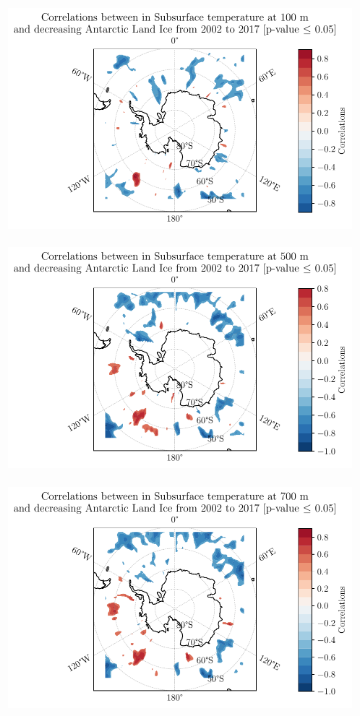 \documentclass[../main.tex]{subfiles}
\begin{document}
\begin{figure}[hbt!]
    \centering
    \begin{subfigure}[b]{0.45\textwidth}
    \includegraphics[width=\textwidth]{images/2021w5/chapter7/hres/decreasing_correlation_spatial_subsurtemp_100}
    \end{subfigure}
    \begin{subfigure}[b]{0.45\textwidth}
    \includegraphics[width=\textwidth]{images/2021w5/chapter7/hres/decreasing_correlation_spatial_subsurtemp_500}
    \end{subfigure}
    \begin{subfigure}[b]{0.45\textwidth}
    \includegraphics[width=\textwidth]{images/2021w5/chapter7/hres/decreasing_correlation_spatial_subsurtemp_700}

\end{subfigure}
\end{figure}
\end{document}

